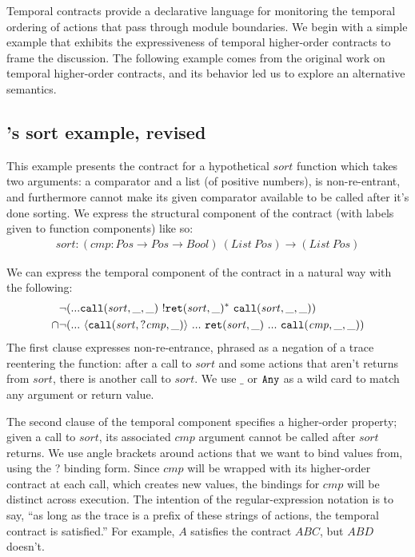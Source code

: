 Temporal contracts provide a declarative language for monitoring the temporal ordering of actions that pass through module boundaries.
%
We begin with a simple example that exhibits the expressiveness of temporal higher-order contracts to frame the discussion.
%
The following example comes from the original work on temporal higher-order contracts, and its behavior led us to explore an alternative semantics.
%
\newcommand{\sortid}{\mathit{sort}}
\subsection{\dfm's sort example, revised} \label{sec:sort}
%
This example presents the contract for a hypothetical $\sortid$ function which takes two arguments: a comparator and a list (of positive numbers), is non-re-entrant, and furthermore cannot make its given comparator available to be called after it's done sorting.
%
We express the structural component of the contract (with labels given to function components) like so:
\begin{align*}
  \sortid : (\mathit{cmp} : \mathit{Pos} \to \mathit{Pos} \to \mathit{Bool})\ (List\ Pos) \to (List\ Pos)
\end{align*}

We can express the temporal component of the contract in a natural way with the following:
\renewcommand*{\arraystretch}{1.2}
\newcommand*{\call}[1]{\scallev{#1}{\_}}
\newcommand*{\ret}[1]{\sretev{#1}{\_}}
\begin{align*}
  &\stnot{(\sddd {\tt call}(\sortid, \_,\_)~ \stmany{\snonevent{{\tt ret}(\sortid, \_)}}~ {\tt call}(\sortid,\_,\_))}
  \\\cap & \stnot{(\sddd~ \stbind{{\tt call}(\sortid, ?\mathit{cmp}, \_)}{\sddd~ {\tt ret}(\sortid, \_)~ \sddd~ {\tt call}(\mathit{cmp}, \_, \_)})}
\end{align*}
%
The first clause expresses non-re-entrance, phrased as a negation of a trace reentering the function: after a call to $\sortid$ and some actions that aren't returns from $\sortid$, there is another call to $\sortid$.
%
We use $\_$ or ${\tt Any}$ as a wild card to match any argument or return value.

The second clause of the temporal component specifies a higher-order property; given a call to $\sortid$, its associated $\mathit{cmp}$ argument cannot be called after $\sortid$ returns.
%
We use angle brackets around actions that we want to bind values from, using the ? binding form.
%
Since $\mathit{cmp}$ will be wrapped with its higher-order contract at each call, which creates new values, the bindings for $\mathit{cmp}$ will be distinct across execution.
%
The intention of the regular-expression notation is to say, ``as long as the trace is a prefix of these strings of actions, the temporal contract is satisfied.''
%
For example, $A$ satisfies the contract $ABC$, but $ABD$ doesn't.

